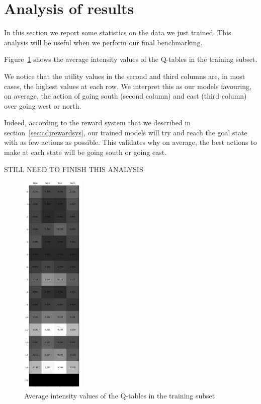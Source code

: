 \section{Analysis of results}
\label{sec:analysisresults}
In this section we report some statistics on the data we just trained. This analysis will be useful when we perform our final benchmarking.

Figure~\ref{fig:Qvalues} shows the average intensity values of the Q-tables in the training subset.

We notice that the utility values in the second and third columns are, in most cases, the highest values at each row. We interpret this as our models favouring, on average, the action of going south (second column) and east (third column) over going west or north.

Indeed, according to the reward system that we described in section~\ref{sec:adjrewardsys}, our trained models will try and reach the goal state with as few actions as possible. This validates why on average, the best actions to make at each state will be going south or going east.

STILL NEED TO FINISH THIS ANALYSIS
\begin{figure}
\centering
\includegraphics[width=3cm]{Figures/Qtable_mean}
\caption{Average intensity values of the Q-tables in the training subset}
\label{fig:Qvalues}
\end{figure}

